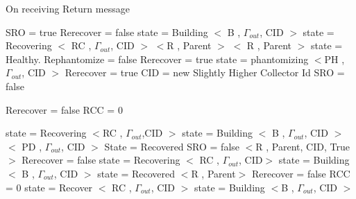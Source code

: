 	
\begin{algorithm}[H]
\caption{On receiving Return message}
\label{ Done message received}
\scriptsize
\begin{algorithmic}[1]
  \State SRO = true
\EndIf
{}
		\State Rerecover = false
			\State state = Building			
			\State $<$ B , $\Gamma_{out}$, CID $>$
		\Else
			\State state = Recovering
			\State $<$ RC , $\Gamma_{out}$, CID $>$
		\EndIf
	\Else
		\State $<$R , Parent $>$
	\EndIf
\EndIf
{}
			\State $<$ R , Parent $>$
		\EndIf
		\State state = Healthy.
	\Else
		\State Rephantomize = false 
		\State Rerecover = true
		\State state = phantomizing
		\State $<$PH , $\Gamma_{out}$, CID $>$
	\EndIf
\EndIf
{}
				\State Rerecover = true
	  \State CID = new Slightly Higher Collector Id
				\State SRO = false
			\EndIf
		
		
				\State Rerecover = false
				\State RCC = 0
				\end{algorithmic}
			\end{algorithm}
					\begin{algorithm}[H]
						\scriptsize
						\begin{algorithmic}
					\State state = Recovering
					\State $<$RC , $\Gamma_{out}$,CID $>$
				\Else
					\State state = Building
					\State $<$ B , $\Gamma_{out}$, CID $>$
				\EndIf
				\State $<$ PD , $\Gamma_{out}$, CID $>$
			\EndIf
		\Else
				\State State = Recovered
				\State SRO = false
				\State $<$R , Parent, CID, True $>$
				\State Rerecover = false
					\State state = Recovering
					\State $<$ RC , $\Gamma_{out}$, CID$>$
					\State state = Building
					\State $<$ B , $\Gamma_{out}$, CID $>$
				\EndIf
				\State state = Recovered
				\State $<$R , Parent$>$
			\EndIf
		\EndIf
			\State Rerecover = false
				\State RCC = 0
			\EndIf
				\State state = Recover
				\State $<$ RC , $\Gamma_{out}$, CID $>$
				\State state = Building
				\State $<$B , $\Gamma_{out}$, CID $>$
			\EndIf
		\EndIf
	\EndIf
\EndIf
\EndProcedure
\end{algorithmic}
\end{algorithm}	


